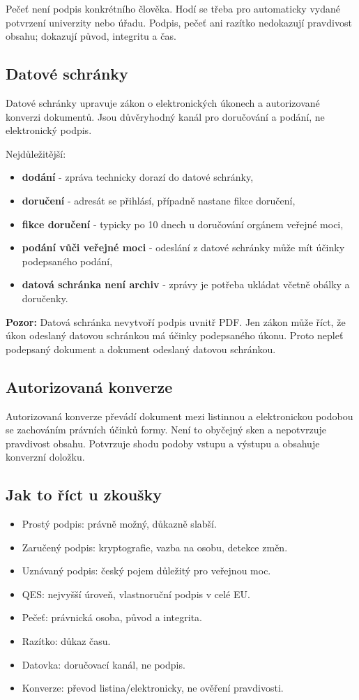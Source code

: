 \documentclass[11pt,a4paper]{article}
\newcommand{\pozor}[1]{\begin{tcolorbox}[breakable,enhanced,colback=red!7,colframe=red!30!black,boxrule=0pt,arc=1mm,left=5pt,right=5pt,top=5pt,bottom=5pt,before skip=6pt,after skip=6pt]\textbf{Pozor:} #1\end{tcolorbox}}
\begin{document}
Pečeť není podpis konkrétního člověka. Hodí se třeba pro automaticky vydané potvrzení univerzity nebo úřadu. Podpis, pečeť ani razítko nedokazují pravdivost obsahu; dokazují původ, integritu a čas.

\subsection*{Datové schránky}
Datové schránky upravuje zákon o elektronických úkonech a autorizované konverzi dokumentů. Jsou důvěryhodný kanál pro doručování a podání, ne elektronický podpis.

Nejdůležitější:
\begin{itemize}
  \item \textbf{dodání} - zpráva technicky dorazí do datové schránky,
  \item \textbf{doručení} - adresát se přihlásí, případně nastane fikce doručení,
  \item \textbf{fikce doručení} - typicky po 10 dnech u doručování orgánem veřejné moci,
  \item \textbf{podání vůči veřejné moci} - odeslání z datové schránky může mít účinky podepsaného podání,
  \item \textbf{datová schránka není archiv} - zprávy je potřeba ukládat včetně obálky a doručenky.
\end{itemize}

\pozor{Datová schránka nevytvoří podpis uvnitř PDF. Jen zákon může říct, že úkon odeslaný datovou schránkou má účinky podepsaného úkonu. Proto nepleť podepsaný dokument a dokument odeslaný datovou schránkou.}

\subsection*{Autorizovaná konverze}
Autorizovaná konverze převádí dokument mezi listinnou a elektronickou podobou se zachováním právních účinků formy. Není to obyčejný sken a nepotvrzuje pravdivost obsahu. Potvrzuje shodu podoby vstupu a výstupu a obsahuje konverzní doložku.

\subsection*{Jak to říct u zkoušky}
\begin{itemize}
  \item Prostý podpis: právně možný, důkazně slabší.
  \item Zaručený podpis: kryptografie, vazba na osobu, detekce změn.
  \item Uznávaný podpis: český pojem důležitý pro veřejnou moc.
  \item QES: nejvyšší úroveň, vlastnoruční podpis v celé EU.
  \item Pečeť: právnická osoba, původ a integrita.
  \item Razítko: důkaz času.
  \item Datovka: doručovací kanál, ne podpis.
  \item Konverze: převod listina/elektronicky, ne ověření pravdivosti.
\end{itemize}
\end{document}
